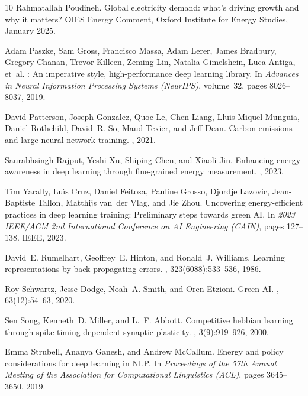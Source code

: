 \documentclass[11pt, english]{article}
\begin{document}
\begin{thebibliography}{10}
Rahmatallah Poudineh.
\newblock Global electricity demand: what's driving growth and why it matters?
\newblock OIES Energy Comment, Oxford Institute for Energy Studies, January
  2025.

Adam Paszke, Sam Gross, Francisco Massa, Adam Lerer, James Bradbury, Gregory
  Chanan, Trevor Killeen, Zeming Lin, Natalia Gimelshein, Luca Antiga, et~al.
: An imperative style, high-performance deep learning
  library.
\newblock In {\em Advances in Neural Information Processing Systems (NeurIPS)},
  volume~32, pages 8026--8037, 2019.

David Patterson, Joseph Gonzalez, Quoc Le, Chen Liang, Lluis-Miquel Munguia,
  Daniel Rothchild, David~R. So, Maud Texier, and Jeff Dean.
\newblock Carbon emissions and large neural network training.
, 2021.

Saurabhsingh Rajput, Yeshi Xu, Shiping Chen, and Xiaoli Jin.
\newblock Enhancing energy-awareness in deep learning through fine-grained
  energy measurement.
, 2023.

Tim Yarally, Lu{\'\i}s Cruz, Daniel Feitosa, Pauline Grosso, Djordje Lazovic,
  Jean-Baptiste Tallon, Matthijs van~der Vlag, and Jie Zhou.
\newblock Uncovering energy-efficient practices in deep learning training:
  Preliminary steps towards green {AI}.
\newblock In {\em 2023 IEEE/ACM 2nd International Conference on AI Engineering
  (CAIN)}, pages 127--138. IEEE, 2023.

David~E. Rumelhart, Geoffrey~E. Hinton, and Ronald~J. Williams.
\newblock Learning representations by back-propagating errors.
, 323(6088):533--536, 1986.

Roy Schwartz, Jesse Dodge, Noah~A. Smith, and Oren Etzioni.
\newblock Green {AI}.
, 63(12):54--63, 2020.

Sen Song, Kenneth~D. Miller, and L.~F. Abbott.
\newblock Competitive hebbian learning through spike-timing-dependent synaptic
  plasticity.
, 3(9):919--926, 2000.

Emma Strubell, Ananya Ganesh, and Andrew McCallum.
\newblock Energy and policy considerations for deep learning in {NLP}.
\newblock In {\em Proceedings of the 57th Annual Meeting of the Association
  for Computational Linguistics (ACL)}, pages 3645--3650, 2019.


\end{thebibliography}
\end{document}

